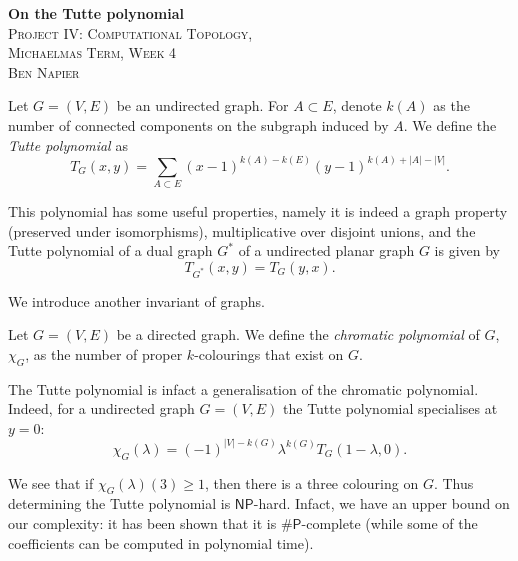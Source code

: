 





\begin{center}
  \textbf{On the Tutte polynomial} \\
  \textsc{Project IV: Computational Topology, \\ Michaelmas Term, Week 4} \\
  \textsc{Ben Napier}
  \vspace{1em}
\end{center}

\begin{definition}
  Let $G = (V,E)$ be an undirected graph. For $A \subset E$, denote $k(A)$ as the number of connected components on the subgraph induced by $A$. We define the \emph{Tutte polynomial} as
  \begin{equation}
    \label{eq:tutte}
    T_G(x,y) = \sum_{A \subset E} (x-1)^{k(A) - k(E)} (y-1)^{k(A) + \lvert A \rvert - \lvert V \rvert}.
  \end{equation}
\end{definition}

This polynomial has some useful properties, namely it is indeed a graph property (preserved under isomorphisms), multiplicative over disjoint unions, and the Tutte polynomial of a dual graph $G^*$ of a undirected planar graph $G$ is given by
\[
  T_{G^*}(x,y) = T_G(y,x).
\]

We introduce another invariant of graphs.

\begin{definition}
  Let $G = (V,E)$ be a directed graph. We define the \emph{chromatic polynomial} of $G$, $\chi_G$, as the number of proper $k$-colourings that exist on $G$.
\end{definition}

The Tutte polynomial is infact a generalisation of the chromatic polynomial. Indeed, for a undirected graph $G = (V,E)$ the Tutte polynomial specialises at $y = 0$:
\begin{equation}
  \chi_G(\lambda) = (-1)^{\lvert V \rvert - k(G)} \lambda^{k(G)} T_G(1 - \lambda, 0).
\end{equation}

We see that if $\chi_G(\lambda)(3) \geq 1$, then there is a three colouring on $G$. Thus determining the Tutte polynomial is $\mathsf{NP}$-hard. Infact, we have an upper bound on our complexity: it has been shown that it is $\mathsf{\#P}$-complete \cite{annan1995complexities} (while some of the coefficients can be computed in polynomial time).

